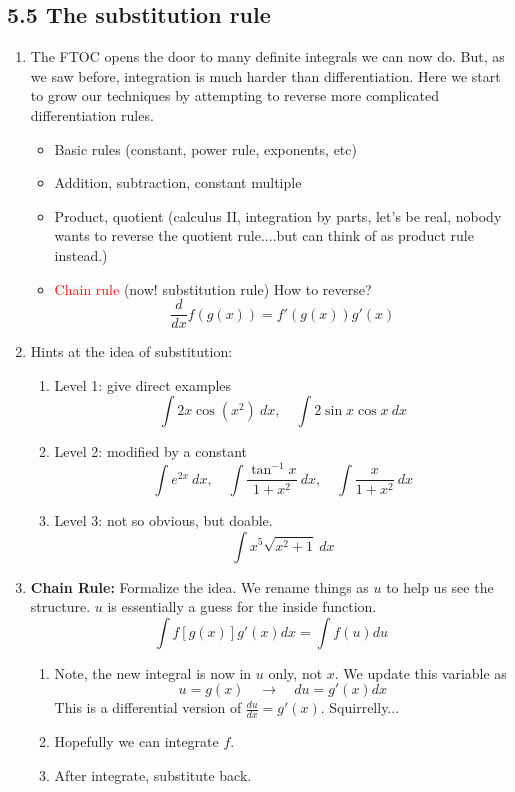 \documentclass{article}
\begin{document}
\subsection{5.5 The substitution rule}
\begin{enumerate}

\item The FTOC opens the door to many definite integrals we can now do. But, as we saw before, integration is much harder than differentiation. Here we start to grow our techniques by attempting to reverse more complicated differentiation rules.
\begin{itemize}
\item Basic rules (constant, power rule, exponents, etc)
\item Addition, subtraction, constant multiple
\item Product, quotient (calculus II, integration by parts, let's be real, nobody wants to reverse the quotient rule....but can think of as product rule instead.)
\item \textcolor{red}{Chain rule} (now! substitution rule) How to reverse?
\[
\frac{d}{dx} f(g(x)) = f'(g(x))g'(x)
\]
\end{itemize}

\item Hints at the idea of substitution:
\begin{enumerate}
\item Level 1: give direct examples
$$
\int 2x\cos(x^2)~dx,\quad \int 2\sin x\cos x~dx
$$
\item Level 2: modified by a constant
$$
\int e^{2x}~dx,\quad\int \frac{\tan^{-1} x}{1+x^2}~dx, \quad \int \frac{x}{1+x^2}~dx
$$
\item Level 3: not so obvious, but doable.
$$
\int x^5\sqrt{x^2+1}~dx
$$
\end{enumerate}

\item {\bf Chain Rule:} Formalize the idea. We rename things as $u$ to help us see the structure. $u$ is essentially a guess for the inside function.
$$
\int f[g(x)]g'(x)dx = \int f(u)du
$$
\begin{enumerate}
\item Note, the new integral is now in $u$ only, not $x$. We update this variable as
\[
u = g(x) \quad \rightarrow \quad du = g'(x) dx 
\]
This is a differential version of $\frac{du}{dx} =g'(x) $. Squirrelly...
\item Hopefully we can integrate $f$.
\item After integrate, substitute back.
\end{enumerate}


\end{enumerate}
\end{document}
